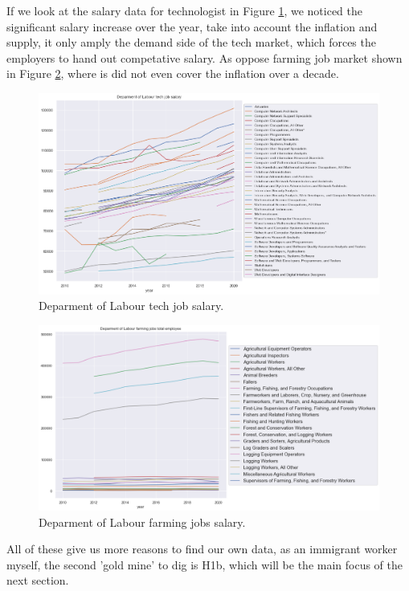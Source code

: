 If we look at the salary data for technologist in Figure \ref{techsalary}, we noticed the significant salary increase over the year, take into account the inflation and supply, it only amply the demand side of the tech market, which forces the employers to hand out competative salary. As oppose farming job market shown in Figure \ref{dolfarmingsalary}, where is did not even cover the inflation over a decade.
\begin{figure}[h]
	\begin{center}
		\includegraphics[width=\linewidth]{./photos/departmentoflabour.png}
	\end{center}
	\caption{Deparment of Labour tech job salary.}
	\label{techsalary}
\end{figure}

\begin{figure}[h]
	\begin{center}
		\includegraphics[width=\linewidth]{./photos/dolfarmingsalary.png}
	\end{center}
	\caption{Deparment of Labour farming jobs salary.}
	\label{dolfarmingsalary}
\end{figure}
All of these give us more reasons to find our own data, as an immigrant worker myself, the second 'gold mine' to dig is H1b, which will be the main focus of the next section.

